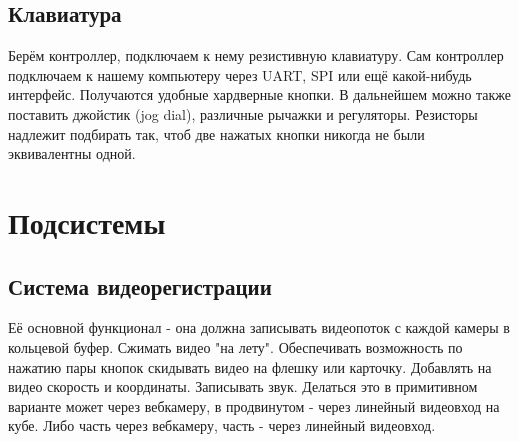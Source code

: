 \documentclass[12pt]{article}
\begin{document}
		\subsection{Клавиатура}
		Берём контроллер, подключаем к нему резистивную клавиатуру. Сам контроллер подключаем к нашему компьютеру через UART, SPI или ещё какой-нибудь интерфейс. 
	Получаются удобные хардверные кнопки. В дальнейшем можно также поставить джойстик (jog dial), различные рычажки и регуляторы. Резисторы надлежит подбирать так, чтоб две нажатых кнопки никогда не были эквивалентны одной. 
		
	\section{Подсистемы}
	\subsection {Система видеорегистрации}
	Её основной функционал - она должна записывать видеопоток с каждой камеры в кольцевой буфер. Сжимать видео "на лету". Обеспечивать возможность по нажатию пары кнопок скидывать видео на флешку или карточку. Добавлять на видео скорость и координаты. Записывать звук. Делаться это в примитивном варианте может через вебкамеру, в продвинутом - через линейный видеовход на кубе. Либо часть через вебкамеру, часть - через линейный видеовход. \\
	
	
	
\end{document}
